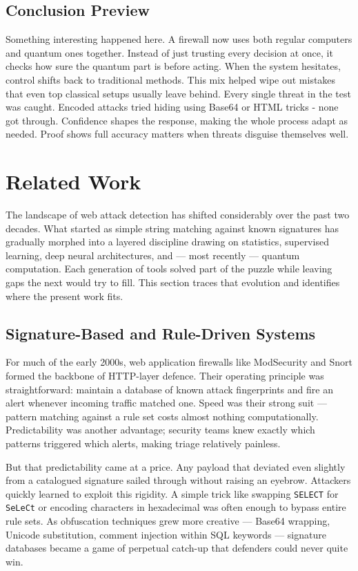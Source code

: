 \documentclass[journal,onecolumn]{IEEEtran}
\begin{document}
\subsection{Conclusion Preview}
Something interesting happened here. A firewall now uses both regular computers and quantum ones together. Instead of just trusting every decision at once, it checks how sure the quantum part is before acting. When the system hesitates, control shifts back to traditional methods. This mix helped wipe out mistakes that even top classical setups usually leave behind. Every single threat in the test was caught. Encoded attacks tried hiding using Base64 or HTML tricks - none got through. Confidence shapes the response, making the whole process adapt as needed. Proof shows full accuracy matters when threats disguise themselves well.


\section{Related Work}

The landscape of web attack detection has shifted considerably over the past two decades. What started as simple string matching against known signatures has gradually morphed into a layered discipline drawing on statistics, supervised learning, deep neural architectures, and --- most recently --- quantum computation. Each generation of tools solved part of the puzzle while leaving gaps the next would try to fill. This section traces that evolution and identifies where the present work fits.

\subsection{Signature-Based and Rule-Driven Systems}

For much of the early 2000s, web application firewalls like ModSecurity and Snort formed the backbone of HTTP-layer defence. Their operating principle was straightforward: maintain a database of known attack fingerprints and fire an alert whenever incoming traffic matched one. Speed was their strong suit --- pattern matching against a rule set costs almost nothing computationally. Predictability was another advantage; security teams knew exactly which patterns triggered which alerts, making triage relatively painless.

But that predictability came at a price. Any payload that deviated even slightly from a catalogued signature sailed through without raising an eyebrow. Attackers quickly learned to exploit this rigidity. A simple trick like swapping \texttt{SELECT} for \texttt{SeLeCt} or encoding characters in hexadecimal was often enough to bypass entire rule sets. As obfuscation techniques grew more creative --- Base64 wrapping, Unicode substitution, comment injection within SQL keywords --- signature databases became a game of perpetual catch-up that defenders could never quite win.
\end{document}
